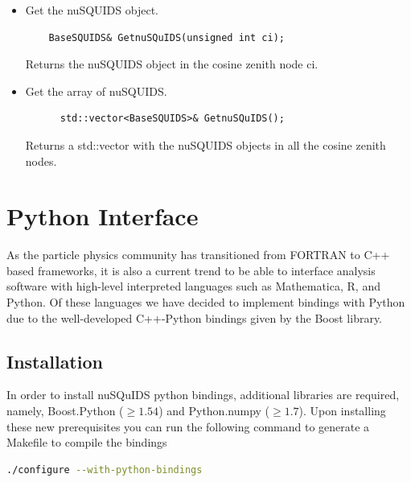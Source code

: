 \documentclass[3p,12pt]{elsarticle}
\newcommand{\ttf}{\ttfamily}
\begin{document}
\begin{itemize}
\item Get the nuSQUIDS object.
  \begin{lstlisting}
    BaseSQUIDS& GetnuSQuIDS(unsigned int ci);
  \end{lstlisting}
  Returns the nuSQUIDS object in the cosine zenith node {\ttf ci}.

\item Get the array of nuSQUIDS.
  \begin{lstlisting}
      std::vector<BaseSQUIDS>& GetnuSQuIDS();
    \end{lstlisting}
    Returns a {\ttf std::vector} with the nuSQUIDS objects in all the
    cosine zenith nodes.
\end{itemize}


\section{Python Interface}
\label{sec:python}

As the particle physics community has transitioned from {\ttfamily FORTRAN} to {\ttfamily C++} based frameworks, 
it is also a current trend to be able to interface analysis software with high-level interpreted 
languages such as {\ttfamily Mathematica}, {\ttfamily R}, and {\ttfamily Python}. 
Of these languages we have decided to implement bindings with Python due to the well-developed 
{\ttfamily C++}-{\ttfamily Python} bindings given by the {\ttfamily Boost} library.

\subsection{Installation}

In order to install nuSQuIDS python bindings, additional libraries are required, namely, {\ttfamily Boost.Python} ($\ge1.54$) and {\ttfamily Python.numpy} ($\ge1.7$). 
Upon installing these new prerequisites you can run the following command to generate a Makefile to compile the bindings

\begin{lstlisting}[language=Bash]
./configure --with-python-bindings
\end{lstlisting}
\end{document}
